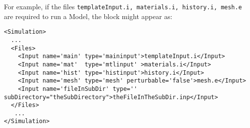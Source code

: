 \vspace{-5mm}
For example, if the files \texttt{templateInput.i, materials.i, history.i, mesh.e}
 are required to run a Model, the  block might appear as:
\begin{lstlisting}[style=XML,morekeywords={name,file}] %moreemph={name,file}]
<Simulation>
  ...
  <Files>
    <Input name='main' type='maininput'>templateInput.i</Input>
    <Input name='mat'  type='mtlinput' >materials.i</Input>
    <Input name='hist' type='histinput'>history.i</Input>
    <Input name='mesh' type='mesh' perturbable='false'>mesh.e</Input>
    <Input name='fileInSubDir' type='' subDirectory="theSubDirectory">theFileInTheSubDir.inp</Input>
  </Files>
   ...
</Simulation>
\end{lstlisting}
